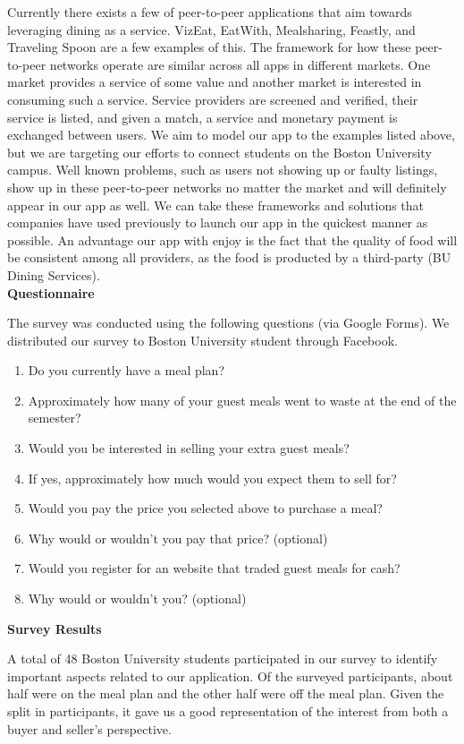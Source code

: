 \documentclass[column,12pt]{article}
\begin{document}
Currently there exists a few of peer-to-peer applications that aim towards leveraging dining as a service. VizEat, EatWith, Mealsharing, Feastly, and Traveling Spoon are a few examples of this. The framework for how these peer-to-peer networks operate are similar across all apps in different markets. One market provides a service of some value and another market is interested in consuming such a service. Service providers are screened and verified, their service is listed, and
given a match, a service and monetary payment is exchanged between users. We aim to model our app to the examples listed above, but we are targeting our efforts to connect students on the Boston University campus. Well known problems, such as users not showing up or faulty listings, show up in these peer-to-peer networks no matter the market and will definitely appear in our app as well. We can take these frameworks and solutions that companies have used previously to launch
our app in the quickest manner as possible. An advantage our app with enjoy is the fact that the quality of food will be consistent among all providers, as the food is producted by a third-party (BU Dining Services). \\

\textbf{Questionnaire}

The survey was conducted using the following questions (via Google Forms). We distributed our survey to Boston University student through Facebook. 
\begin{enumerate}
    \item Do you currently have a meal plan?
    \item Approximately how many of your guest meals went to waste at the end of the semester?
    \item Would you be interested in selling your extra guest meals?
    \item If yes, approximately how much would you expect them to sell for? 
    \item Would you pay the price you selected above to purchase a meal?
    \item Why would or wouldn't you pay that price? (optional)
    \item Would you register for an website that traded guest meals for cash?
    \item Why would or wouldn't you? (optional)
\end{enumerate}

\textbf{Survey Results}

A total of 48 Boston University students participated in our survey to identify important aspects related to our application. Of the surveyed participants, about half were on the meal plan and the other half were off the meal plan. Given the split in participants, it gave us a good representation of the interest from both a buyer and seller's perspective. 
\end{document}
